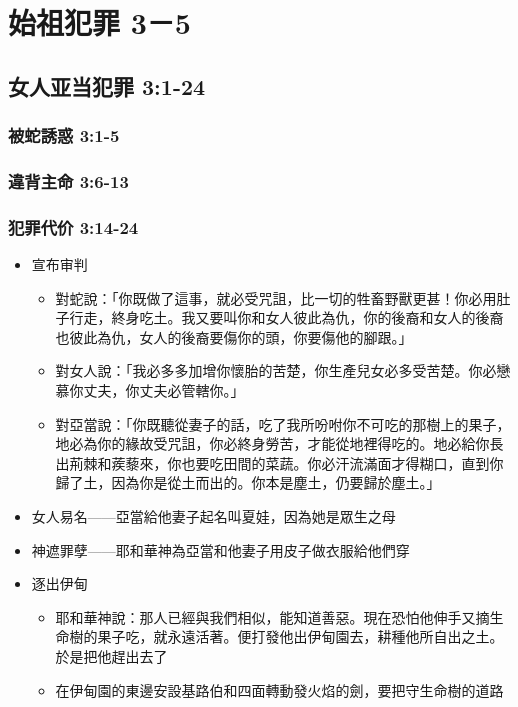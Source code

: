 \section{始祖犯罪 3－5 }
\subsection{女人亚当犯罪 3:1-24 }
\subsubsection{被蛇誘惑 3:1-5 }


\subsubsection{違背主命 3:6-13 }



\subsubsection{犯罪代价 3:14-24 }
\begin{itemize} 
\itemsep-.35em 
\item 宣布审判
\begin{itemize} 
\itemsep-.35em 
\item 對蛇說：「你既做了這事，就必受咒詛，比一切的牲畜野獸更甚！你必用肚子行走，終身吃土。我又要叫你和女人彼此為仇，你的後裔和女人的後裔也彼此為仇，女人的後裔要傷你的頭，你要傷他的腳跟。」
\item 對女人說：「我必多多加增你懷胎的苦楚，你生產兒女必多受苦楚。你必戀慕你丈夫，你丈夫必管轄你。」
\item 對亞當說：「你既聽從妻子的話，吃了我所吩咐你不可吃的那樹上的果子，地必為你的緣故受咒詛，你必終身勞苦，才能從地裡得吃的。地必給你長出荊棘和蒺藜來，你也要吃田間的菜蔬。你必汗流滿面才得糊口，直到你歸了土，因為你是從土而出的。你本是塵土，仍要歸於塵土。」
\end{itemize}
\item 女人易名——亞當給他妻子起名叫夏娃，因為她是眾生之母
\item 神遮罪孽——耶和華神為亞當和他妻子用皮子做衣服給他們穿
\item 逐出伊甸 
\begin{itemize} 
\itemsep-.35em 
\item 耶和華神說：那人已經與我們相似，能知道善惡。現在恐怕他伸手又摘生命樹的果子吃，就永遠活著。便打發他出伊甸園去，耕種他所自出之土。於是把他趕出去了 
\item 在伊甸園的東邊安設基路伯和四面轉動發火焰的劍，要把守生命樹的道路
\end{itemize}
\end{itemize}
 
